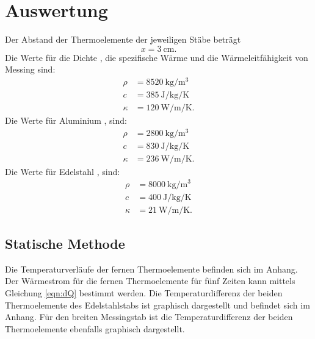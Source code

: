 \section{Auswertung}
\label{sec:Auswertung}
Der Abstand der Thermoelemente der jeweiligen Stäbe beträgt
\begin{equation*}
    x = \SI{3}{\centi\meter}.
\end{equation*}
Die Werte für die Dichte \cite{V204}, die spezifische Wärme \cite{V204} und 
die Wärmeleitfähigkeit \cite{wiki} von Messing sind: 
\begin{align*}
    \rho &= \SI{8520}{\kilo\gram\per\cubic\meter} \\
    c &= \SI{385}{\joule\per\kilo\gram\per\kelvin} \\
    \kappa &= \SI{120}{\watt\per\meter\per\kelvin}.
\end{align*}
Die Werte für Aluminium \cite{V204}, \cite{wiki} sind:
\begin{align*}
    \rho &= \SI{2800}{\kilo\gram\per\cubic\meter} \\
    c &= \SI{830}{\joule\per\kilo\gram\per\kelvin} \\
    \kappa &= \SI{236}{\watt\per\meter\per\kelvin}.
\end{align*}
Die Werte für Edelstahl \cite{V204}, \cite{edelstahl} sind:
\begin{align*}
    \rho &= \SI{8000}{\kilo\gram\per\cubic\meter} \\
    c &= \SI{400}{\joule\per\kilo\gram\per\kelvin} \\
    \kappa &= \SI{21}{\watt\per\meter\per\kelvin}.
\end{align*}

\subsection{Statische Methode}
Die Temperaturverläufe der fernen Thermoelemente
befinden sich im Anhang. %
\newline
Der Wärmestrom für die fernen Thermoelemente für fünf Zeiten kann mittels
Gleichung \ref{eqn:dQ} bestimmt werden. %
\newline
Die Temperaturdifferenz der beiden Thermoelemente des Edelstahlstabs
ist graphisch dargestellt und befindet sich im Anhang. %
Für den breiten Messingstab ist die Temperaturdifferenz der beiden
Thermoelemente ebenfalls graphisch dargestellt. %

